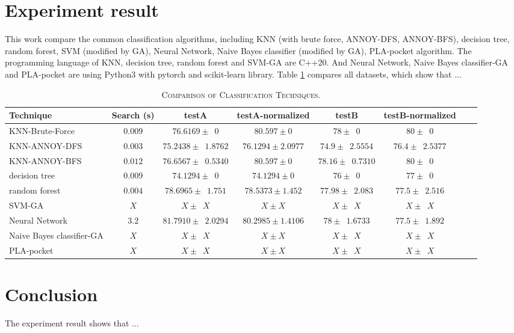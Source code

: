 \documentclass[twocolumn,10pt]{article}
\begin{document}
\section{Experiment result}
  This work compare the common classification algorithms, including KNN (with brute force, ANNOY-DFS, ANNOY-BFS), decision tree, 
  random forest, SVM (modified by GA), Neural Network, Naive Bayes classifier (modified by GA), PLA-pocket algorithm. 
  The programming language of KNN, decision tree, random forest and SVM-GA are C++20. And Neural Network, Naive Bayes classifier-GA 
  and PLA-pocket are using Python3 with pytorch and scikit-learn library. 
  Table \ref{table:overall} compares all datasets, which show that ...
  \begin{table}[htb]
    \newcommand{\z}{\phantom{0}}
    \caption{\textsc{Comparison of Classification Techniques.}}
      \vspace{-\baselineskip}
    \begin{tabular}{@{}lccccccl@{}}\toprule
    Technique & Search (s) & testA & testA-normalized & testB & testB-normalized \\ \midrule
    KNN-Brute-Force  & $0.009$ & $76.6169 \pm \z{0}$                & $80.597 \pm 0$               & $78 \pm \z{0}$                 & $80 \pm \z{0}$\\
    KNN-ANNOY-DFS    & $0.003$ & $75.2438 \pm \z{1.8762}$           & $76.1294 \pm 2.0977$         & $74.9 \pm \z{2.5554}$          & $76.4 \pm \z{2.5377}$\\
    KNN-ANNOY-BFS    & $0.012$ & $76.6567 \pm \z{0.5340}$           & $80.597 \pm 0$               & $78.16 \pm \z{0.7310}$         & $80 \pm \z{0}$\\
    decision tree    & $0.009$ & $74.1294 \pm \z{0}$                & $74.1294 \pm 0$              & $76 \pm \z{0}$                 & $77 \pm \z{0}$\\
    random forest    & $0.004$ & $78.6965 \pm \z{1.751}$            & $78.5373 \pm 1.452$          & $77.98 \pm \z{2.083}$          & $77.5 \pm \z{2.516}$\\
    SVM-GA           & $X$ & $X \pm \z{X}$                          & $X \pm X$                    & $X \pm \z{X}$                  & $X \pm \z{X}$\\
    Neural Network   & $3.2$   & $81.7910 \pm \z{2.0294}$           & $80.2985 \pm 1.4106$         & $78 \pm \z{1.6733}$            & $77.5 \pm \z{1.892}$\\
    Naive Bayes classifier-GA    & $X$ & $X \pm \z{X}$              & $X \pm X$                    & $X \pm \z{X}$                  & $X \pm \z{X}$\\
    PLA-pocket       & $X$ & $X \pm \z{X}$                          & $X \pm X$                    & $X \pm \z{X}$                  & $X \pm \z{X}$\\ \midrule
    \end{tabular}
    \label{table:overall}
      \vspace{-\baselineskip}
  \end{table}

\section{Conclusion}
  The experiment result shows that ...


\end{document}
